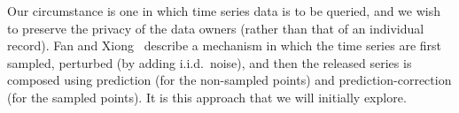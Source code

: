 Our circumstance is one in which time series data is to be queried, and we
wish to preserve the privacy of the data owners (rather than that of
an individual record).
Fan and Xiong~\cite{fx12,fx14} describe a mechanism in which the time
series are first sampled, perturbed (by adding i.i.d.~noise), and then
the released series is composed using prediction (for the non-sampled
points) and prediction-correction (for the sampled points).  It is this
approach that we will initially explore.

